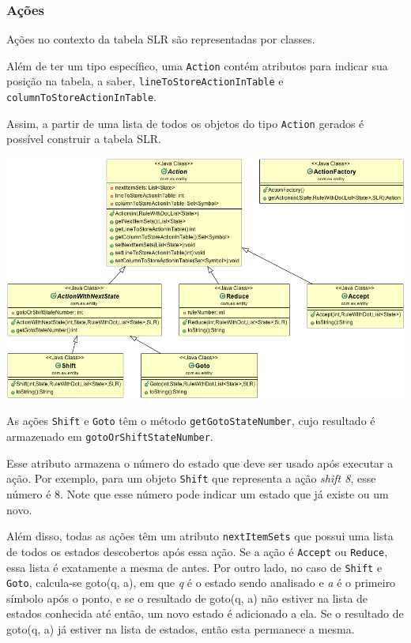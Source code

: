 \documentclass[11pt]{article}
\begin{document}
\subsubsection{Ações}
\label{sec:orgheadline11}
Ações no contexto da tabela SLR são representadas por classes.

Além de ter um tipo específico, uma \texttt{Action} contém atributos para indicar sua
posição na tabela, a saber, \texttt{lineToStoreActionInTable} e \texttt{columnToStoreActionInTable}.

Assim, a partir de uma lista de todos os objetos do tipo \texttt{Action} gerados é
possível construir a tabela SLR.

\includegraphics[width=.9\linewidth]{./media/actions.png}

As ações \texttt{Shift} e \texttt{Goto} têm o método \texttt{getGotoStateNumber}, cujo resultado é
armazenado em \texttt{gotoOrShiftStateNumber}.

Esse atributo armazena o número do estado que deve ser usado após executar a
ação. Por exemplo, para um objeto \texttt{Shift} que representa a ação \emph{shift 8}, esse
número é 8. Note que esse número pode indicar um estado que já existe ou um
novo.

Além disso, todas as ações têm um atributo \texttt{nextItemSets} que possui uma lista
de todos os estados descobertos após essa ação. Se a ação é  \texttt{Accept} ou
\texttt{Reduce}, essa lista é exatamente a mesma de antes. Por outro lado, no
caso de \texttt{Shift} e \texttt{Goto}, calcula-se goto(q, a), em que \emph{q} é o estado sendo
analisado e \emph{a} é o primeiro símbolo após o ponto, e se o resultado de goto(q,
a) não estiver na lista de estados conhecida até então, um novo estado é
adicionado a ela. Se o resultado de goto(q, a) já estiver na lista de estados,
então esta permanece a mesma.
\end{document}
